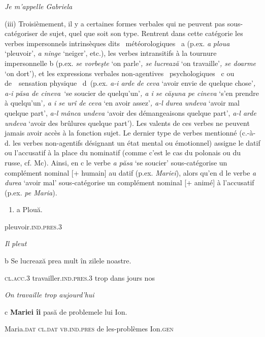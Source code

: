 {\itshape
Je m'appelle Gabriela}

(iii) Troisièmement, il y a certaines formes verbales qui ne peuvent pas sous-catégoriser de sujet, quel que soit son type. Rentrent dans cette catégorie les verbes impersonnels intrinsèques dits {\guillemotleft}~météorologiques~{\guillemotright} a (p.ex. \textit{a} \textit{ploua} `pleuvoir',\textit{ a ninge} `neiger', etc.), les verbes intransitifs à la tournure impersonnelle b (p.ex. \textit{se vorbeşte} `on parle'\textit{, se lucrează} `on travaille'\textit{, se doarme} `on dort'), et les expressions verbales non-agentives {\guillemotleft}~psychologiques~{\guillemotright} c ou de~{\guillemotleft}~sensation physique~{\guillemotright} d~(p.ex. \textit{a-i arde de ceva} `avoir envie de quelque chose'\textit{, a-i păsa de cineva~}`se soucier de quelqu'un'\textit{, a i se căşuna pe cineva} `s'en prendre à quelqu'un'\textit{, a i se urî de ceva} `en avoir assez'\textit{, a-l durea undeva} `avoir mal quelque part', \textit{a-l mânca undeva} `avoir des démangeaisons quelque part', \textit{a-l arde undeva} `avoir des brûlures quelque part'). Les valents de ces verbes ne peuvent jamais avoir accès à la fonction sujet. Le dernier type de verbes mentionné (c.-à-d. les verbes non-agentifs désignant un état mental ou émotionnel) assigne le datif ou l'accusatif à la place du nominatif (comme c'est le cas du polonais ou du russe, cf. Mc\citet{Shane2005}). Ainsi, en c le verbe \textit{a păsa} `se soucier' sous-catégorise un complément nominal [+ humain] au datif (p.ex. \textit{Mariei}), alors qu'en d le verbe \textit{a durea} `avoir mal' sous-catégorise un complément nominal [+ animé] à l'accusatif (p.ex. \textit{pe Maria}). 


\begin{enumerate}
\item \label{bkm:Ref299303333}a  Plouă. 


\end{enumerate}
pleuvoir.\textsc{ind.pres.3}

{\itshape
Il pleut}

b  Se  lucrează  prea mult  în  zilele  noastre. 

\textsc{cl.acc.3 } travailler.\textsc{ind.pres.3}  trop  dans  jours  nos

{\itshape
On travaille trop aujourd'hui}

c  \textbf{Mariei  îi}  pasă  de  problemele  lui Ion.  

  Maria.\textsc{dat  cl.dat  vb.ind.pres}  de  les-problèmes  Ion.\textsc{gen}

